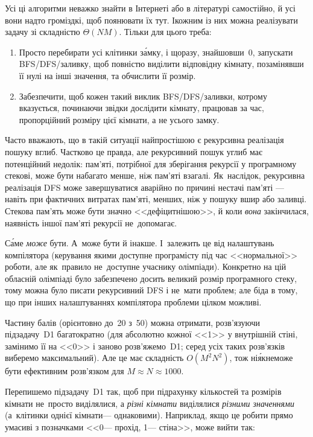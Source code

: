 \documentclass[14pt,a4paper]{extarticle}
\begin{document}
Усі ці алгоритми неважко знайти в Інтернеті або в літературі самостійно, й усі вони надто громіздкі, щоб поянювати їх тут. І\nolinebreak[3] кожним із них можна реалізувати задачу зі складністю $\Theta(NM)$. Тільки для цього треба:
\begin{enumerate}
\item
Просто перебирати усі клітинки з\'{а}мку, і щоразу, знайшовши~0, запускати BFS/DFS/заливку, щоб повністю виділити відповідну кімнату, позамінявши її нулі на інші значення, та обчислити її розмір.
\item
Забезпечити, щоб кожен такий виклик BFS/DFS/заливки, котрому вказується, починаючи звідки дослідити кімнату, працював за час, пропорційний розміру цієї кімнати, а не усього замку.
\end{enumerate}

\myhrulefill

Часто вважають, що в такій ситуації найпростішою є рекурсивна реалізація пошуку вглиб. Частково це правда, але рекурсивний пошук углиб має потенційний недолік: пам'яті, потрібної для зберігання рекурсії у програмному стекові, може бути набагато менше, ніж пам'яті взагалі. Як~наслідок, рекурсивна реалізація DFS може завершуватися аварійно по причині \mbox{нестачі} пам'яті --- навіть при фактичних витратах пам'яті, менших, ніж у пошуку вшир або заливці. Стекова пам'ять може бути значно <<дефіцитнішою>>, й коли \emph{вона} закінчилася, наявність іншої пам'яті рекурсії не~допомагає.

С\'{а}ме \emph{може} бути. А~може бути й інакше. І~залежить це від налаштувань компілятора (керування якими доступне програмісту під час <<нормальної>> роботи, але як~правило не~доступне учаснику олімпіади). Конкретно на цій обласній олімпіаді було забезпечено досить великий розмір програмного стеку, тому можна було писати рекурсивний DFS і не~мати проблем; але біда в тому, що при інших налаштуваннях компілятора проблеми цілком можливі.







Частину балів (орієнтовно до~20 з~50) можна отримати, розв’язуючи підзадачу~D1 багатократно (для абсолютно кожної <<1>> у внутрішній стіні, замінимо її на <<0>> і заново розв’яжемо~D1; серед усіх таких розв’язків виберемо максимальний). Але це має складність $O(M^2N^2)$, тож ні\'{я}к\nolinebreak[2] не\nolinebreak[3] може бути ефективним розв’язком для $M{\approx}N{\approx}1000$.

Перепишемо підзадачу~D1 так, щоб при підрахунку кількостей та розмірів кімнати не~просто виділялися, а \emph{різні кімнати} виділялися \emph{різними значеннями} (а~клітинки однієї кімнати\nolinebreak[3] --- однаковими). Наприклад, якщо це робити прямо у\nolinebreak[3] масиві з позначками <<0\nolinebreak[3] --- прохід, 1\nolinebreak[3] --- стіна>>, може вийти так:
\end{document}
